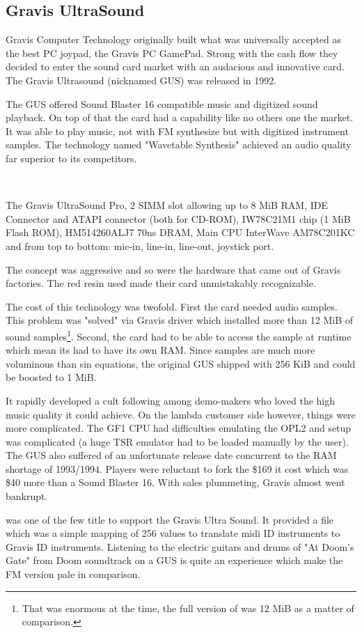 \subsection{Gravis UltraSound}
Gravis Computer Technology originally built what was universally accepted as the best PC joypad, the Gravis PC GamePad. Strong with the cash flow they decided to enter the sound card market with an audacious and innovative card. The Gravis Ultrasound (nicknamed GUS) was released in 1992.\\
\par
The GUS offered Sound Blaster 16 compatible music and digitized sound playback. On top of that the card had a capability like no others one the market. It was able to play music, not with FM synthesize but with digitized instrument samples. The technology named "Wavetable Synthesis" achieved an audio quality far superior to its competitors.


\\
\par
The Gravis UltraSound Pro,  2 SIMM slot allowing up to 8 MiB RAM,  IDE Connector and  ATAPI connector (both for CD-ROM),  IW78C21M1 chip (1 MiB Flash ROM),  HM514260ALJ7 70ns DRAM,  Main CPU InterWave AM78C201KC and  from top to bottom: mic-in, line-in, line-out, joystick port.\\
\par
The concept was aggressive and so were the hardware that came out of Gravis factories. The red resin used made their card unmistakably recognizable.\\
\par
The cost of this technology was twofold. First the card needed audio samples. This problem was "solved" via Gravis driver which installed more than 12 MiB of sound samples\footnote{That was enormous at the time, the full version of \doom was 12 MiB as a matter of comparison.}. Second, the card had to be able to access the sample at runtime which mean its had to have its own RAM. Since samples are much more voluminous than sin equations, the original GUS shipped with 256 KiB and could be boosted to 1 MiB.\\
\par
It rapidly developed a cult following among demo-makers who loved the high music quality it could achieve. On the lambda customer side however, things were more complicated. The GF1 CPU had difficulties emulating the OPL2 and setup was complicated (a huge TSR emulator had to be loaded manually by the user). The GUS also suffered of an unfortunate release date concurrent to the RAM shortage of 1993/1994. Players were reluctant to fork the \$169 it cost which was \$40 more than a Sound Blaster 16. With sales plummeting, Gravis almost went bankrupt.\\
\par
 \doom was one of the few title to support the Gravis Ultra Sound. It provided a  file which was a simple mapping of 256 values to translate midi ID instruments to Gravis ID instruments. Listening to the electric guitars and drums of "At Doom's Gate" from Doom soundtrack on a GUS is quite an experience which make the FM version pale in comparison.